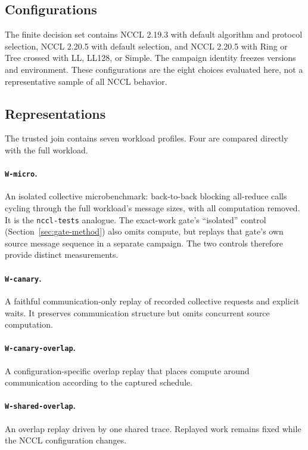 \documentclass[10pt,twocolumn]{article}
\newcommand{\wname}[1]{\texttt{W-#1}}
\begin{document}
\subsection{Configurations}

The finite decision set contains NCCL 2.19.3 with default algorithm and
protocol selection, NCCL 2.20.5 with default selection, and NCCL 2.20.5 with
Ring or Tree crossed with LL, LL128, or Simple. The campaign identity freezes
versions and environment. These configurations are the eight choices evaluated
here, not a representative sample of all NCCL behavior.

\subsection{Representations}

The trusted join contains seven workload profiles. Four are compared directly
with the full workload.

\paragraph{\wname{micro}.} An isolated collective microbenchmark: back-to-back
blocking all-reduce calls cycling through the full workload's message sizes,
with all computation removed. It is the \texttt{nccl-tests} analogue. The
exact-work gate's ``isolated'' control (Section~\ref{sec:gate-method}) also
omits compute, but replays that gate's own source message sequence in a
separate campaign. The two controls therefore provide distinct measurements.

\paragraph{\wname{canary}.} A faithful communication-only replay of recorded
collective requests and explicit waits. It preserves communication structure
but omits concurrent source computation.

\paragraph{\wname{canary-overlap}.} A configuration-specific overlap replay
that places compute around communication according to the captured schedule.

\paragraph{\wname{shared-overlap}.} An overlap replay driven by one shared
trace. Replayed work remains fixed while the NCCL configuration changes.
\end{document}
